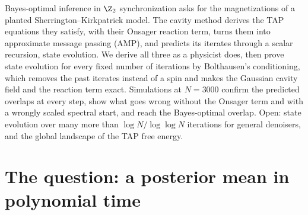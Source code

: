 \begin{refsection}

\newcommand{\ampmmse}{\mathrm{mmse}}
\newcommand{\ampnorm}[1]{\lVert #1\rVert_N}
\newcommand{\ampto}{\xrightarrow{\ \Prob\ }}
\newcommand{\ampGOE}{\mathrm{GOE}}
\newcommand{\ampTAP}{\mathrm{TAP}}
\newcommand{\ampPL}{\mathrm{PL}(2)}

\begin{chaptersummary}
Bayes-optimal inference in $\Z_2$ synchronization asks for the magnetizations of a planted Sherrington--Kirkpatrick model. The cavity method derives the TAP equations they satisfy, with their Onsager reaction term, turns them into approximate message passing (AMP), and predicts its iterates through a scalar recursion, state evolution. We derive all three as a physicist does, then prove state evolution for every fixed number of iterations by Bolthausen's conditioning, which removes the past iterates instead of a spin and makes the Gaussian cavity field and the reaction term exact. Simulations at $N=3000$ confirm the predicted overlaps at every step, show what goes wrong without the Onsager term and with a wrongly scaled spectral start, and reach the Bayes-optimal overlap. Open: state evolution over many more than $\log N/\log\log N$ iterations for general denoisers, and the global landscape of the TAP free energy.
\end{chaptersummary}

\section{The question: a posterior mean in polynomial time}\label{sec:amp:question}


\end{refsection}
